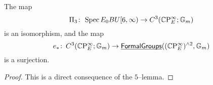 \begin{corollary}
The map \[\Pi_3\colon\thinspace \operatorname{Spec} E_0 BU[6, \infty) \to C^3(\mathbb{C}\mathrm P^\infty_E; \mathbb G_m)\] is an isomorphism, and the map \[e_*\colon\thinspace C^3(\mathbb{C}\mathrm P^\infty_E; \mathbb G_m) \to \operatorname{\underline{\smash{\mathsf{FormalGroups}}}}((\mathbb{C}\mathrm P^\infty_E)^{\wedge 2}, \mathbb G_m)\] is a surjection.
\end{corollary}
\begin{proof}
This is a direct consequence of the $5$--lemma.
\end{proof}










